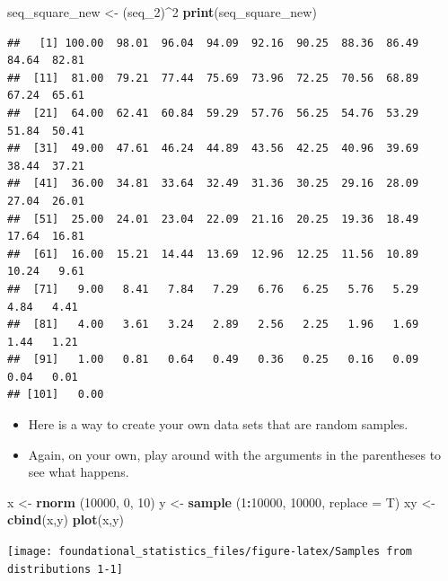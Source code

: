 \documentclass[]{book}
\newenvironment{Shaded}{\begin{snugshade}}{\end{snugshade}}
\newcommand{\DataTypeTok}[1]{\textcolor[rgb]{0.13,0.29,0.53}{#1}}
\newcommand{\DecValTok}[1]{\textcolor[rgb]{0.00,0.00,0.81}{#1}}
\newcommand{\KeywordTok}[1]{\textcolor[rgb]{0.13,0.29,0.53}{\textbf{#1}}}
\newcommand{\NormalTok}[1]{#1}
\newcommand{\OperatorTok}[1]{\textcolor[rgb]{0.81,0.36,0.00}{\textbf{#1}}}
\newcommand{\StringTok}[1]{\textcolor[rgb]{0.31,0.60,0.02}{#1}}
\begin{document}
\begin{Shaded}
\begin{Highlighting}[]
\NormalTok{seq_square_new <-}\StringTok{ }\NormalTok{(seq_}\DecValTok{2}\NormalTok{)}\OperatorTok{^}\DecValTok{2}
\KeywordTok{print}\NormalTok{(seq_square_new)}
\end{Highlighting}
\end{Shaded}

\begin{verbatim}
##   [1] 100.00  98.01  96.04  94.09  92.16  90.25  88.36  86.49  84.64  82.81
##  [11]  81.00  79.21  77.44  75.69  73.96  72.25  70.56  68.89  67.24  65.61
##  [21]  64.00  62.41  60.84  59.29  57.76  56.25  54.76  53.29  51.84  50.41
##  [31]  49.00  47.61  46.24  44.89  43.56  42.25  40.96  39.69  38.44  37.21
##  [41]  36.00  34.81  33.64  32.49  31.36  30.25  29.16  28.09  27.04  26.01
##  [51]  25.00  24.01  23.04  22.09  21.16  20.25  19.36  18.49  17.64  16.81
##  [61]  16.00  15.21  14.44  13.69  12.96  12.25  11.56  10.89  10.24   9.61
##  [71]   9.00   8.41   7.84   7.29   6.76   6.25   5.76   5.29   4.84   4.41
##  [81]   4.00   3.61   3.24   2.89   2.56   2.25   1.96   1.69   1.44   1.21
##  [91]   1.00   0.81   0.64   0.49   0.36   0.25   0.16   0.09   0.04   0.01
## [101]   0.00
\end{verbatim}

\begin{itemize}
\item
  Here is a way to create your own data sets that are random samples.
\item
  Again, on your own, play around with the arguments in the parentheses to see what happens.
\end{itemize}

\begin{Shaded}
\begin{Highlighting}[]
\NormalTok{x <-}\StringTok{ }\KeywordTok{rnorm}\NormalTok{ (}\DecValTok{10000}\NormalTok{, }\DecValTok{0}\NormalTok{, }\DecValTok{10}\NormalTok{)}
\NormalTok{y <-}\StringTok{ }\KeywordTok{sample}\NormalTok{ (}\DecValTok{1}\OperatorTok{:}\DecValTok{10000}\NormalTok{, }\DecValTok{10000}\NormalTok{, }\DataTypeTok{replace =}\NormalTok{ T)}
\NormalTok{xy <-}\StringTok{ }\KeywordTok{cbind}\NormalTok{(x,y)}
\KeywordTok{plot}\NormalTok{(x,y) }
\end{Highlighting}
\end{Shaded}

\texttt{[image: foundational\_statistics\_files/figure-latex/Samples from distributions 1-1]}
\end{document}
